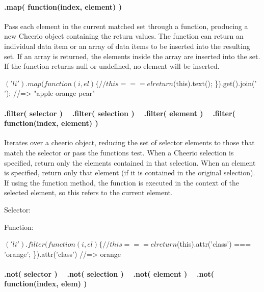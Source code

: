 \paragraph*{.map( function(index, element) )}

Pass each element in the current matched set through a function, producing a new Cheerio object containing the return values. The function can return an individual data item or an array of data items to be inserted into the resulting set. If an array is returned, the elements inside the array are inserted into the set. If the function returns null or undefined, no element will be inserted.


\begin{DoxyCode}
$('li').map(function(i, el) \{
  // this === el
  return $(this).text();
\}).get().join(' ');
//=> "apple orange pear"
\end{DoxyCode}


\paragraph*{.filter( selector ) ~\newline
 .filter( selection ) ~\newline
 .filter( element ) ~\newline
 .filter( function(index, element) )}

Iterates over a cheerio object, reducing the set of selector elements to those that match the selector or pass the function\textquotesingle{}s test. When a Cheerio selection is specified, return only the elements contained in that selection. When an element is specified, return only that element (if it is contained in the original selection). If using the function method, the function is executed in the context of the selected element, so {\ttfamily this} refers to the current element.

Selector\+:




Function\+:


\begin{DoxyCode}
$('li').filter(function(i, el) \{
  // this === el
  return $(this).attr('class') === 'orange';
\}).attr('class')
//=> orange
\end{DoxyCode}


\paragraph*{.not( selector ) ~\newline
 .not( selection ) ~\newline
 .not( element ) ~\newline
 .not( function(index, elem) )}

